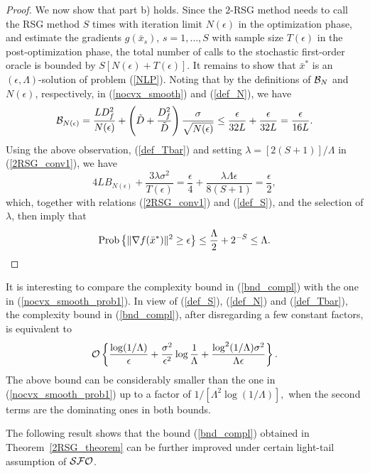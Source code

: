 \documentclass[final]{siamltex}
\newcommand{\beq}{\begin{equation}}
\newcommand{\eeq}{\end{equation}}
\def\eqnok#1{(\ref{#1})}
\def\vgap{\vspace*{.1in}}
\def\prob{{\rm Prob}}
\def\prob{\mathop{\rm Prob}}
\def\SFO{{\cal SFO}}
\def\cB{{\cal B}}
\begin{document}
\begin{proof}
We now show that part b) holds.
Since the $2$-RSG method needs to call the RSG method $S$ times with iteration limit $N(\epsilon)$
in the optimization phase, and estimate the gradients $g(\bar x_s)$, $s = 1, \ldots, S$ with sample
size $T(\epsilon)$ in the post-optimization phase, the total number of calls to the stochastic first-order oracle is bounded
by $S [N(\epsilon) + T(\epsilon)]$. It remains to show that $\bar x^*$ is an $(\epsilon, \Lambda)$-solution
of problem \eqnok{NLP}. Noting that by the definitions of $\cB_N$ and $N(\epsilon)$, respectively,
in \eqnok{nocvx_smooth} and \eqnok{def_N}, we have
\[
\cB_{N(\epsilon)} = \frac{L D_f^2}{N(\epsilon)} +
\left( \tilde D + \frac{D_f^2}{\tilde D}\right) \frac{\sigma}{\sqrt{N(\epsilon)}}
\le \frac{\epsilon}{32L} + \frac{\epsilon}{32L} = \frac{\epsilon}{16L}.
\]
Using the above observation, \eqnok{def_Tbar} and setting $\lambda = [2 (S+1)]/\Lambda$ in \eqnok{2RSG_conv1},
we have
\[
4 L B_{N(\epsilon)} + \frac{3 \lambda \sigma^2}{T(\epsilon)}
= \frac{\epsilon}{4} + \frac{\lambda \Lambda \epsilon}{8 (S+1)} = \frac{\epsilon}{2},
\]
which, together with relations  \eqnok{2RSG_conv1} and \eqnok{def_S},
and the selection of $\lambda$, then imply that
\[
\prob\left\{\|\nabla f(\bar x^*)\|^2  \ge \epsilon \right\} \le \frac{\Lambda}{2} +
2^{-S} \le \Lambda.
\]
\end{proof}

\vgap

It is interesting to compare the complexity bound in \eqnok{bnd_compl} with the one in
\eqnok{nocvx_smooth_prob1}. In view of \eqnok{def_S}, \eqnok{def_N} and \eqnok{def_Tbar},
the complexity bound in \eqnok{bnd_compl},
after disregarding a few constant factors, is equivalent to
\beq \label{improved_compl}
{\cal O} \left\{
\frac{\log (1/\Lambda) }{\epsilon}  +
\frac{\sigma^2}{\epsilon^2} \log \frac{1}{\Lambda}
+ \frac{\log^2(1/\Lambda) \sigma^2 }{\Lambda \epsilon}
\right\}.
\eeq
The above bound can be considerably smaller than the one in \eqnok{nocvx_smooth_prob1}
up to a factor of
$
1 / \left[\Lambda^2 \log(1/\Lambda)  \right],
$
when the second terms are the dominating ones in both bounds.

\vgap

The following result shows that the bound \eqnok{bnd_compl} obtained in Theorem~\ref{2RSG_theorem} can
be further improved under certain light-tail assumption of $\SFO$.
\end{document}
